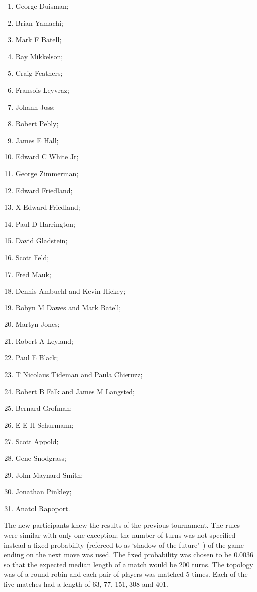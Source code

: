 \documentclass{article}
\theoremstyle{definition}
\begin{document}
\begin{multicols}{3}
\begin{enumerate}
        \item George Duisman;
        \item Brian Yamachi;
        \item Mark F Batell;
        \item Ray Mikkelson;
        \item Craig Feathers;
        \item Fransois Leyvraz;
        \item Johann Joss;
        \item Robert Pebly;
        \item James E Hall;
        \item Edward C White Jr;
        \item George Zimmerman;
        \item Edward Friedland;
        \item X	Edward Friedland;
        \item Paul D Harrington;
        \item David Gladstein;
        \item Scott Feld;
        \item Fred Mauk;
        \item Dennis Ambuehl and Kevin Hickey;
        \item Robyn M Dawes and Mark Batell;
        \item Martyn Jones;
        \item Robert A Leyland;
        \item Paul E Black;
        \item T Nicolaus Tideman and Paula Chieruzz;
        \item Robert B Falk and James M Langsted;
        \item Bernard Grofman;
        \item E E H Schurmann;
        \item Scott Appold;
        \item Gene Snodgrass;
        \item John Maynard Smith;
        \item Jonathan Pinkley;
        \item Anatol Rapoport.
    \end{enumerate}
\end{multicols}

The new participants knew the results of the previous tournament. The rules
were similar with only one exception;
the number of turns was not specified instead a fixed probability (refereed to as
`shadow of the future'~\cite{Axelrod1988}) of the game ending on the next move
was used. The fixed probability was chosen to be 0.0036 so that the expected
median length of a match would be 200 turns. The topology was of a round robin
and each pair of players was matched 5 times. Each of the five matches had a
length of 63, 77, 151, 308 and 401.
\end{document}
